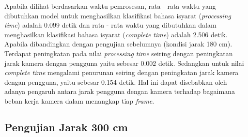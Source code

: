 Apabila dilihat berdasarkan waktu pemrosesan, rata - rata waktu yang dibutuhkan model untuk menghasilkan klasifikasi bahasa isyarat (\emph{processing time}) adalah 0.099 detik dan rata - rata waktu yang dibutuhkan dalam menghasilkan klasifikasi bahasa isyarat (\emph{complete time}) adalah 2.506 detik. Apabila dibandingkan dengan pengujian sebelumnya (kondisi jarak 180 cm). Terdapat peningkatan pada nilai \emph{processing time} seiring dengan peningkatan jarak kamera dengan pengguna yaitu sebesar 0.002 detik. Sedangkan untuk nilai \emph{complete time} mengalami penurunan seiring dengan peningkatan jarak kamera dengan pengguna, yaitu sebesar 0.154 detik. Hal ini dapat disebabkan oleh adanya pengaruh antara jarak pengguna dengan kamera terhadap bagaimana beban kerja kamera dalam menangkap tiap \emph{frame}.

\newpage
\subsection{Pengujian Jarak 300 cm}
\label{sec:analisisjarak3}

